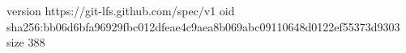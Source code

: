 version https://git-lfs.github.com/spec/v1
oid sha256:bb06d6bfa96929fbc012dfeae4c9aea8b069abc09110648d0122ef55373d9303
size 388
